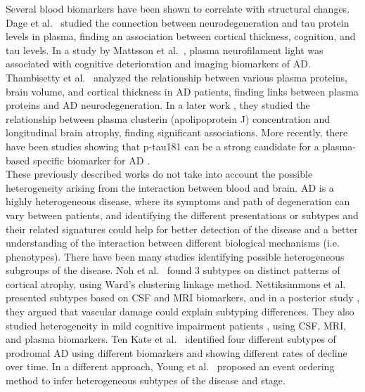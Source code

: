 Several blood biomarkers have been shown to correlate with structural changes. Dage et al.\ \cite{Dage2016} studied the connection between neurodegeneration and tau protein levels in plasma, finding an association between cortical thickness, cognition, and tau levels. In a study by Mattsson et al.\ \cite{Mattsson2017}, plasma neurofilament light was associated with cognitive deterioration and imaging biomarkers of AD. Thambisetty et al.\ \cite{Thambisetty2011} analyzed the relationship between various plasma proteins, brain volume, and cortical thickness in AD patients, finding links between plasma proteins and AD neurodegeneration. In a later work \cite{Thambisetty2012}, they studied the relationship between plasma clusterin (apolipoprotein J) concentration and longitudinal brain atrophy, finding significant associations.  More recently, there have been studies showing that p-tau181 can be a strong candidate for a plasma-based specific biomarker for AD \cite{Cullen2020,Moscoso2020,Karikari2020a}. \\

These previously described works do not take into account the possible heterogeneity arising from the interaction between blood and brain. AD is a highly heterogeneous disease, where its symptoms and path of degeneration can vary between patients, and identifying the different presentations or subtypes and their related signatures could help for better detection of the disease and a better understanding of the interaction between different biological mechanisms (i.e. phenotypes). There have been many studies identifying possible heterogeneous subgroups of the disease. Noh et al.\ \cite{Noh2014} found 3 subtypes on distinct patterns of cortical atrophy, using Ward's clustering linkage method. Nettiksimmons et al.\ \cite{Nettiksimmons2010} presented subtypes based on CSF and MRI biomarkers, and in a posterior study \cite{Nettiksimmons2013}, they argued that vascular damage could explain subtyping differences. They also studied heterogeneity in mild cognitive impairment patients \cite{Nettiksimmons2014}, using CSF, MRI, and plasma biomarkers. Ten Kate et al.\ \cite{TenKate2018} identified four different subtypes of prodromal AD using different biomarkers and showing different rates of decline over time. In a different approach, Young et al.\ \cite{Young2015a,Young2017} proposed an event ordering method to infer heterogeneous subtypes of the disease and stage.  \\


